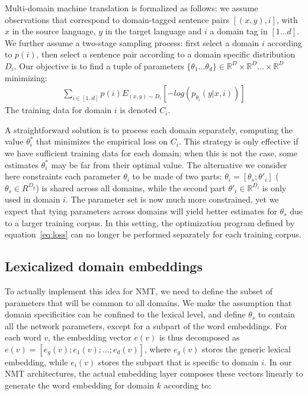 \documentclass[a4paper]{article}
\newcommand{\fyDone}[1]{\done[FY]\Todo[FY:]{\textcolor{orange}{#1}}}
\begin{document}
Multi-domain machine translation is formalized as follows: we assume observations that correspond to  domain-tagged sentence pairs $[(x,y),i]$, with $x$ in the source language, $y$ in the target language and $i$ a domain tag in $[1\dots d]$. We further assume a two-stage sampling process: first select a domain $i$ according to $p(i)$, then select a sentence pair according to a domain specific distribution $D_i$. Our objective is to find a tuple of parameters $\{\theta_1 \dots \theta_d \} \in \mathbb{R}^D \times \mathbb{R}^D \dots \times \mathbb{R}^D$ minimizing:
\begin{equation} \label{eq:loss}
\begin{split}
\sum_{i \in [1..d]} p(i) E_{(x,y) \sim D_{i}} [-log(p_{\theta_i}(y|x,i))]
\end{split}
\end{equation}
The training data for domain $i$ is denoted $C_i$.

A straightforward solution is to process each domain separately, computing the value $\theta_i^*$ that minimizes the empirical loss on $C_i$. This strategy is only effective if we have sufficient training data for each domain; when this is not the case, some estimates $\theta_i^*$ may be far from their optimal value. \fyDone{Risk}
The alternative we consider here constraints each parameter $\theta_i$ to be made of two parts: $\theta_i = [\theta_s; \theta'_i]$ ($\theta_s \in R^{D_g}$) is shared across all domains, while the second part $\theta'_i \in \mathbb{R}^{D_i}$ is only used in domain $i$.
The parameter set is now much more constrained, yet we expect that tying parameters across domains will yield better estimates for $\theta_s$ due to a larger training corpus. In this setting, the optimization program defined by equation~\eqref{eq:loss} can no longer be performed separately for each training corpus.

\subsection{Lexicalized domain embeddings \label{ssec:lde}}

To actually implement this idea for NMT, we need to define the subset of parameters that will be common to all domains. 
We make the assumption that domain specificities can be confined to the lexical level, and define $\theta_s$ to contain all the network parameters, except for a subpart of the word embeddings. 
For each word $v$, the embedding vector $e(v)$ is thus decomposed as $e(v) = [e_g(v); e_1(v); \dots; e_d(v)]$, where $e_g(v)$ stores the generic lexical embedding, while $e_i(v)$ stores the subpart that is specific to domain $i$.
In our NMT architectures, the actual embedding layer composes these vectors linearly to generate the word embedding for domain $k$ according to:
\end{document}
